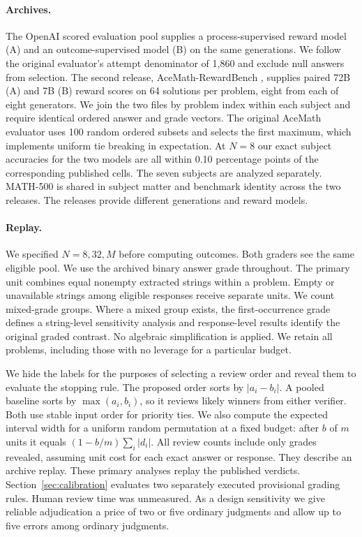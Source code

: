 \paragraph{Archives.}
The OpenAI scored evaluation pool \cite{lightman} supplies a process-supervised reward model (A) and an outcome-supervised model (B) on the same generations. We follow the original evaluator's attempt denominator of 1,860 and exclude null answers from selection. The second release, AceMath-RewardBench \cite{ace}, supplies paired 72B (A) and 7B (B) reward scores on 64 solutions per problem, eight from each of eight generators. We join the two files by problem index within each subject and require identical ordered answer and grade vectors. The original AceMath evaluator uses 100 random ordered subsets and selects the first maximum, which implements uniform tie breaking in expectation. At $N=8$ our exact subject accuracies for the two models are all within 0.10 percentage points of the corresponding published cells. The seven subjects are analyzed separately. MATH-500 is shared in subject matter and benchmark identity across the two releases. The releases provide different generations and reward models.

\paragraph{Replay.}
We specified $N=8,32,M$ before computing outcomes. Both graders see the same eligible pool. We use the archived binary answer grade throughout. The primary unit combines equal nonempty extracted strings within a problem. Empty or unavailable strings among eligible responses receive separate units. We count mixed-grade groups. Where a mixed group exists, the first-occurrence grade defines a string-level sensitivity analysis and response-level results identify the original graded contrast. No algebraic simplification is applied. We retain all problems, including those with no leverage for a particular budget.

We hide the labels for the purposes of selecting a review order and reveal them to evaluate the stopping rule. The proposed order sorts by $|a_i-b_i|$. A pooled baseline sorts by $\max(a_i,b_i)$, so it reviews likely winners from either verifier. Both use stable input order for priority ties. We also compute the expected interval width for a uniform random permutation at a fixed budget: after $b$ of $m$ units it equals $(1-b/m)\sum_i |d_i|$. All review counts include only grades revealed, assuming unit cost for each exact answer or response. They describe an archive replay. These primary analyses replay the published verdicts. Section~\ref{sec:calibration} evaluates two separately executed provisional grading rules. Human review time was unmeasured. As a design sensitivity we give reliable adjudication a price of two or five ordinary judgments and allow up to five errors among ordinary judgments.

